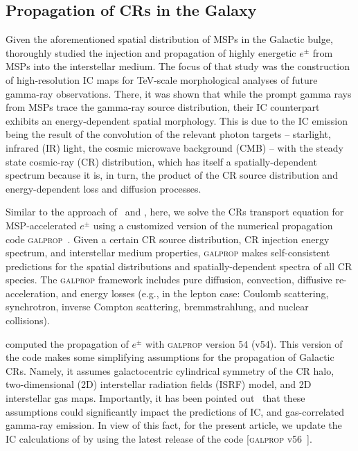 \documentclass[doublespace,nopageskip]{VTthesis} %
\begin{document}
\subsection{Propagation of CRs in the Galaxy}
\label{subsec:propagation}

Given the aforementioned spatial distribution of MSPs in the Galactic bulge, \cite{2019PhRvD..99l3020S} thoroughly studied the injection and propagation of highly energetic $e^{\pm}$ from MSPs into the interstellar medium. The focus of that study was the construction of high-resolution IC maps for TeV-scale morphological analyses of future gamma-ray observations. There, it was shown that while the prompt gamma rays from MSPs trace the gamma-ray source distribution, their IC counterpart exhibits an energy-dependent spatial morphology. This is due to the IC emission being the result of 
the convolution of the relevant photon targets -- starlight, infrared (IR) light, the cosmic microwave background (CMB) -- with the
steady state cosmic-ray (CR) distribution, which has itself 
a spatially-dependent spectrum because it is, in turn, the product of the CR source distribution and energy-dependent loss and diffusion processes.


Similar to the approach of~\citet{2019PhRvD..99l3020S} and \citet{2020JCAP...01..003I}, here, we solve the CRs transport equation for MSP-accelerated $e^{\pm}$ using a customized version of the numerical propagation code \textsc{galprop}~\citep{2006ApJ...648L..29P,2007ARNPS..57..285S}. Given a certain CR source distribution, CR injection energy spectrum, and interstellar medium properties, \textsc{galprop} makes self-consistent predictions  
for the spatial distributions and spatially-dependent spectra of
 all CR species. The \textsc{galprop} framework includes pure diffusion, convection, diffusive re-acceleration, and energy losses (e.g., in the lepton case: Coulomb scattering, synchrotron, inverse Compton scattering, bremmstrahlung,  and nuclear collisions). 


\citet{2019PhRvD..99l3020S} computed the propagation of $e^{\pm}$ with \textsc{galprop} version 54 (v54). This version of the code makes some simplifying assumptions for the propagation of Galactic CRs. Namely, it  assumes galactocentric cylindrical symmetry of the CR halo, two-dimensional (2D) interstellar radiation fields (ISRF) model, and 2D interstellar gas maps. Importantly, it has been pointed out~\citep{2017ApJ...846...67P,2018ApJ...856...45J} that these assumptions could significantly impact the predictions of IC, and gas-correlated gamma-ray emission. In view of this fact, for the present article, we update the IC calculations of \citet{2019PhRvD..99l3020S} by using the latest release of the code [\textsc{galprop} v56~\citep{2017ApJ...846...67P,2018ApJ...856...45J}].    
\end{document}
